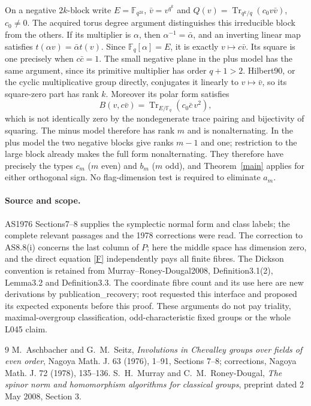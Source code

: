 \documentclass[11pt]{article}
\newcommand{\F}{\mathbb F}\newcommand{\Sp}{\operatorname{Sp}}\newcommand{\diag}{\operatorname{diag}}\newcommand{\Tr}{\operatorname{Tr}}\newcommand{\Om}{\Omega}
\begin{document}
On a negative $2k$-block write $E=\F_{q^{2k}}$, $\bar v=v^{q^k}$ and
$Q(v)=\Tr_{q^k/q}(c_0v\bar v)$, $c_0\ne0$.
The acquired torus degree argument distinguishes this irreducible block
from the others. If its multiplier is $\alpha$, then
$\alpha^{-1}=\bar\alpha$, and an inverting linear map satisfies
$t(\alpha v)=\bar\alpha t(v)$. Since $\F_q[\alpha]=E$, it is exactly
$v\mapsto c\bar v$. Its square is one precisely when $c\bar c=1$.
The small negative plane in the plus model has the same argument,
since its primitive multiplier has order $q+1>2$.
Hilbert90, or the cyclic
multiplicative group directly, conjugates it linearly to $v\mapsto\bar v$,
so its square-zero part has rank $k$. Moreover its polar form satisfies
\[
             B(v,c\bar v)=\Tr_{E/\F_q}(c_0\bar c\,v^2),
\]
which is not identically zero by the nondegenerate trace pairing and
bijectivity of squaring. The minus model therefore has rank $m$ and is
nonalternating. In the plus model the two negative blocks give ranks
$m-1$ and one; restriction to the large block already makes the full
form nonalternating. They therefore have precisely the types $c_m$
($m$ even) and $b_m$ ($m$ odd), and Theorem~\ref{main} applies for either
orthogonal sign. No flag-dimension test is required to eliminate $a_m$.

\paragraph{Source and scope.}
AS1976 Sections7--8 supplies the symplectic normal form and class labels;
the complete relevant passages and the 1978 corrections were read.
The correction to AS8.8(i) concerns the last column of $P$; here the
middle space has dimension zero, and the direct equation \eqref{F}
independently pays all finite fibres. The Dickson convention is retained
from Murray--Roney-Dougal2008, Definition3.1(2), Lemma3.2 and
Definition3.3. The coordinate fibre count
and its use here are new derivations by publication\_recovery; root
requested this interface and proposed its expected exponents before
this proof. These arguments do not pay triality, maximal-overgroup
classification, odd-characteristic fixed groups or the whole L045 claim.

\begin{thebibliography}{9}\small
{} M.~Aschbacher and G.~M.~Seitz,
\emph{Involutions in Chevalley groups over fields of even order},
Nagoya Math. J. 63 (1976), 1--91, Sections 7--8; corrections,
Nagoya Math. J. 72 (1978), 135--136.
 S.~H.~Murray and C.~M.~Roney-Dougal,
\emph{The spinor norm and homomorphism algorithms for classical groups},
preprint dated 2 May 2008, Section 3.
\end{thebibliography}
\end{document}
